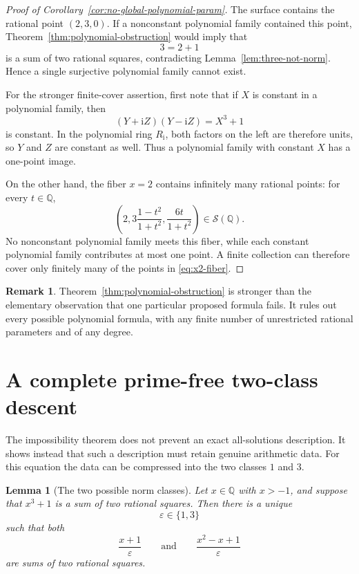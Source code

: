 \documentclass[11pt,a4paper]{article}
\numberwithin{equation}{section}
\newtheorem{lemma}[theorem]{Lemma}
\theoremstyle{definition}
\newtheorem{remark}[theorem]{Remark}
\newcommand{\Q}{\mathbb Q}
\newcommand{\ii}{\mathrm i}
\begin{document}
\begin{proof}[Proof of Corollary~\ref{cor:no-global-polynomial-param}]
The surface contains the rational point $(2,3,0)$.  If a nonconstant
polynomial family contained this point, Theorem~\ref{thm:polynomial-obstruction}
would imply that
\[
 3=2+1
\]
is a sum of two rational squares, contradicting
Lemma~\ref{lem:three-not-norm}.  Hence a single surjective polynomial family
cannot exist.

For the stronger finite-cover assertion, first note that if $X$ is constant
in a polynomial family, then
\[
 (Y+\ii Z)(Y-\ii Z)=X^3+1
\]
is constant.  In the polynomial ring $R_{\ii}$, both factors on the left are
therefore units, so $Y$ and $Z$ are constant as well.  Thus a polynomial
family with constant $X$ has a one-point image.

On the other hand, the fiber $x=2$ contains infinitely many rational points:
for every $t\in\Q$,
\begin{equation}
 \left(
 2,
 3\frac{1-t^2}{1+t^2},
 \frac{6t}{1+t^2}
 \right)
 \in\mathcal S(\Q).
 \label{eq:x2-fiber}
\end{equation}
No nonconstant polynomial family meets this fiber, while each constant
polynomial family contributes at most one point.  A finite collection can
therefore cover only finitely many of the points in \eqref{eq:x2-fiber}.
\end{proof}

\begin{remark}
Theorem~\ref{thm:polynomial-obstruction} is stronger than the elementary
observation that one particular proposed formula fails.  It rules out every
possible polynomial formula, with any finite number of unrestricted rational
parameters and of any degree.
\end{remark}

\section{A complete prime-free two-class descent}
\label{sec:two-class-descent}

The impossibility theorem does not prevent an exact all-solutions
description.  It shows instead that such a description must retain genuine
arithmetic data.  For this equation the data can be compressed into the two
classes $1$ and $3$.

\begin{lemma}[The two possible norm classes]
\label{lem:two-norm-classes}
Let $x\in\Q$ with $x>-1$, and suppose that $x^3+1$ is a sum of two rational
squares.  Then there is a unique
\[
 \varepsilon\in\{1,3\}
\]
such that both
\begin{equation}
 \frac{x+1}{\varepsilon}
 \qquad\text{and}\qquad
 \frac{x^2-x+1}{\varepsilon}
 \label{eq:two-factor-norms}
\end{equation}
are sums of two rational squares.
\end{lemma}
\end{document}
